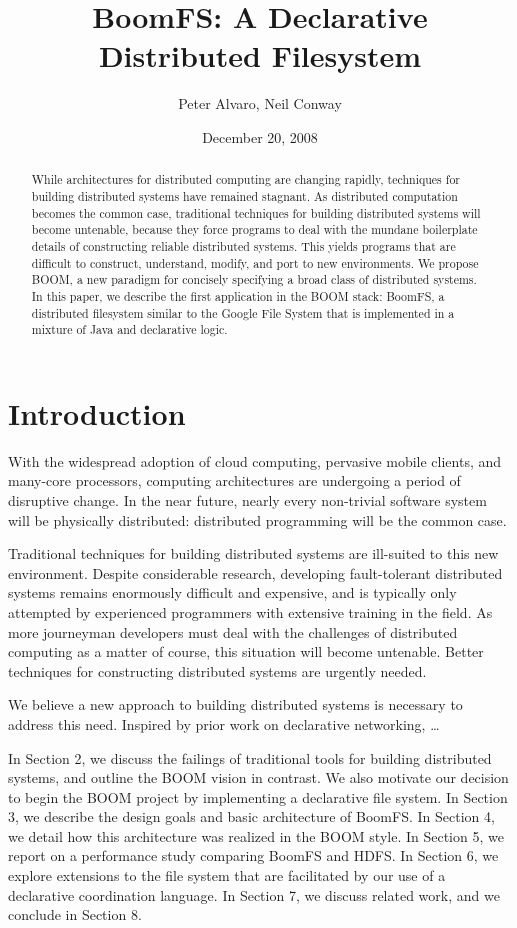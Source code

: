 \documentclass{article}
\title{BoomFS: A Declarative Distributed Filesystem}
\author{Peter Alvaro, Neil Conway}
\date{December 20, 2008}
\begin{document}
\maketitle
\begin{abstract}
  While architectures for distributed computing are changing rapidly,
  techniques for building distributed systems have remained
  stagnant. As distributed computation becomes the common case,
  traditional techniques for building distributed systems will become
  untenable, because they force programs to deal with the mundane
  boilerplate details of constructing reliable distributed
  systems. This yields programs that are difficult to construct,
  understand, modify, and port to new environments. We propose BOOM, a
  new paradigm for concisely specifying a broad class of distributed
  systems. In this paper, we describe the first application in the
  BOOM stack: BoomFS, a distributed filesystem similar to the Google
  File System\cite{gfs} that is implemented in a mixture of Java and
  declarative logic.
\end{abstract}

\section{Introduction}
With the widespread adoption of cloud computing, pervasive mobile
clients, and many-core processors, computing architectures are
undergoing a period of disruptive change. In the near future, nearly
every non-trivial software system will be physically distributed:
distributed programming will be the common case.

Traditional techniques for building distributed systems are ill-suited
to this new environment. Despite considerable research, developing
fault-tolerant distributed systems remains enormously difficult and
expensive, and is typically only attempted by experienced programmers
with extensive training in the field. As more journeyman developers
must deal with the challenges of distributed computing as a matter of
course, this situation will become untenable. Better techniques for
constructing distributed systems are urgently needed.

We believe a new approach to building distributed systems is necessary
to address this need. Inspired by prior work on declarative
networking, \ldots

In Section 2, we discuss the failings of traditional tools for
building distributed systems, and outline the BOOM vision in
contrast. We also motivate our decision to begin the BOOM project by
implementing a declarative file system. In Section 3, we describe the
design goals and basic architecture of BoomFS. In Section 4, we detail
how this architecture was realized in the BOOM style. In Section 5, we
report on a performance study comparing BoomFS and HDFS\cite{}. In
Section 6, we explore extensions to the file system that are
facilitated by our use of a declarative coordination language. In
Section 7, we discuss related work, and we conclude in Section 8.
\end{document}
